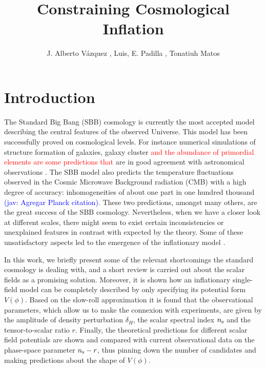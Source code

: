 \documentclass{rmaa}
\title{Constraining Cosmological Inflation}
\author{
J. Alberto V\'azquez \altaffilmark{1}, Luis, E. Padilla \altaffilmark{2,3}, Tonatiuh Matos \altaffilmark{2,3}}
\newcommand{\jav}[1]{\textcolor{blue}{(jav: #1)}}
\begin{document}

  \maketitle

\section{Introduction}

The Standard Big Bang (SBB) cosmology is currently the most accepted model describing 
the central features of the observed Universe. This model has been successfully proved on 
cosmological levels. For instance numerical simulations of structure formation of galaxies,
galaxy cluster \textcolor{red}{and the abundance of primordial elements are some predictions that} 
are in good agreement with astronomical observations \citep{Teg, Sping,Kolbbo}. 
The SBB model also predicts the temperature fluctuations observed in the Cosmic 
Microwave Background radiation (CMB) with a high degree of accuracy: 
inhomogeneities of about one part in one hundred thousand \citep{Komat} \jav{Agregar Planck citation}.
 These two predictions, amongst many others, are the great success of 
the SBB cosmology. Nevertheless, %
when we have a closer look at different scales, there might seem to exist certain 
inconsistencies or unexplained features in contrast   with expected by 
the theory. Some of these unsatisfactory aspects led to the 
emergence of the inflationary model \citep{Guth, Linde, Linde2, Steinhardt}.

In this work, we briefly present some of the relevant shortcomings the standard 
cosmology is dealing with, and a short review is carried out about the scalar fields as  a
promising solution. Moreover, it is shown how an inflationary single-field model can be 
completely described by only specifying its potential form $V(\phi)$. 
Based on the slow-roll approximation it is found that the observational parameters, 
which allow us to make the connexion with experiments, are given by 
the amplitude of density perturbation $\delta_H$, the scalar spectral index $n_{\rm s}$
and the tensor-to-scalar ratio $r$.
Finally, the theoretical predictions for different scalar field potentials are shown and 
compared with current observational data on the phase-space parameter $n_{\rm s}-r$, 
thus pinning down the number of candidates and making predictions about the shape of $V(\phi)$. 
\end{document}
